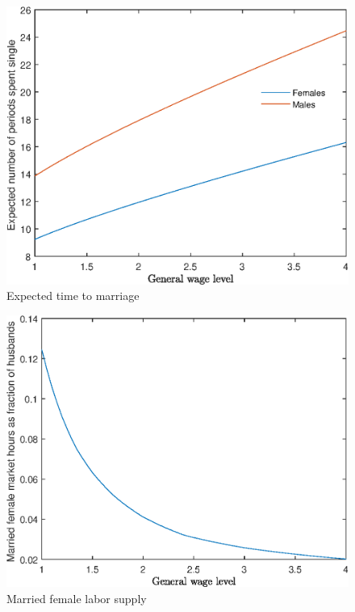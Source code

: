 \documentclass[12pt]{article}
\begin{document}
\begin{figure}
	\centering
	\caption{Expected time to marriage}
	\includegraphics{Graphs/exp_single_general_wage_ex1.eps}
\end{figure}

\begin{figure}
	\centering
	\caption{Married female labor supply}
	\includegraphics{Graphs/lf_general_wage_ex1.eps}
\end{figure}
\end{document}
